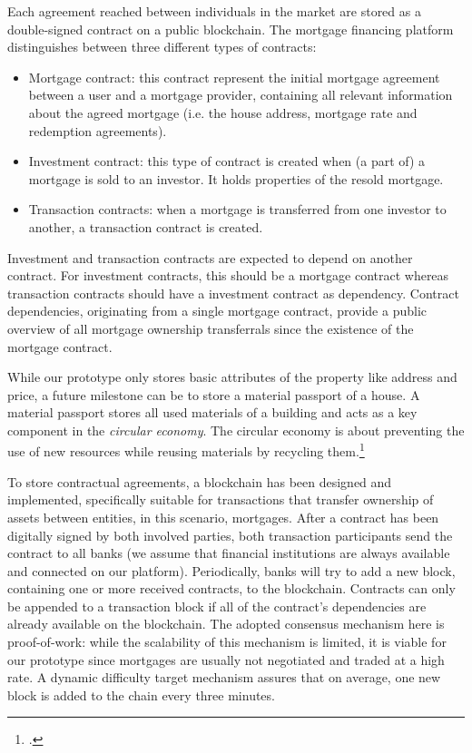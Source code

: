 \documentclass[USenglish]{article}
\begin{document}
Each agreement reached between individuals in the market are stored as a double-signed contract on a public blockchain.
The mortgage financing platform distinguishes between three different types of contracts:
\begin{itemize}
	\item Mortgage contract: this contract represent the initial mortgage agreement between a user and a mortgage provider, containing all relevant information about the agreed mortgage (i.e. the house address, mortgage rate and redemption agreements).
	\item Investment contract: this type of contract is created when (a part of) a mortgage is sold to an investor. It holds properties of the resold mortgage.
	\item Transaction contracts: when a mortgage is transferred from one investor to another, a transaction contract is created.
\end{itemize}
Investment and transaction contracts are expected to depend on another contract.
For investment contracts, this should be a mortgage contract whereas transaction contracts should have a investment contract as dependency.
Contract dependencies, originating from a single mortgage contract, provide a public overview of all mortgage ownership transferrals since the existence of the mortgage contract.

While our prototype only stores basic attributes of the property like address and price, a future milestone can be to store a material passport of a house.
A material passport stores all used materials of a building and acts as a key component in the \emph{circular economy}.
The circular economy is about preventing the use of new resources while reusing materials by recycling them.\footcite{madasterpassport}

To store contractual agreements, a blockchain has been designed and implemented, specifically suitable for transactions that transfer ownership of assets between entities, in this scenario, mortgages.
After a contract has been digitally signed by both involved parties, both transaction participants send the contract to all banks (we assume that financial institutions are always available and connected on our platform).
Periodically, banks will try to add a new block, containing one or more received contracts, to the blockchain.
Contracts can only be appended to a transaction block if all of the contract's dependencies are already available on the blockchain.
The adopted consensus mechanism here is proof-of-work: while the scalability of this mechanism is limited, it is viable for our prototype since mortgages are usually not negotiated and traded at a high rate.
A dynamic difficulty target mechanism assures that on average, one new block is added to the chain every three minutes.
\end{document}
